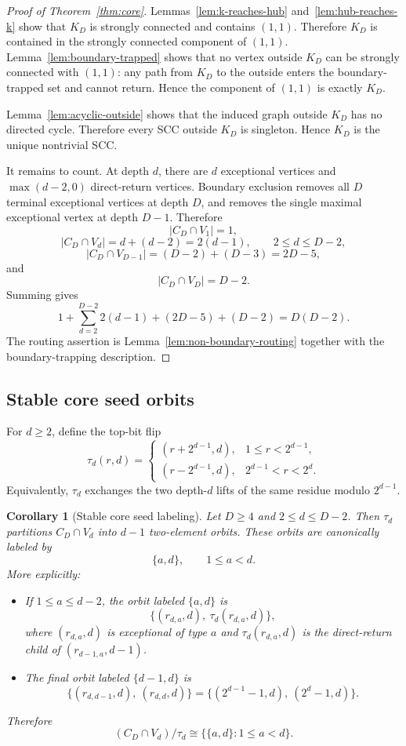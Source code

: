 \documentclass[11pt]{article}
\newtheorem{corollary}[theorem]{Corollary}
\theoremstyle{definition}
\theoremstyle{remark}
\begin{document}
\begin{proof}[Proof of Theorem~\ref{thm:core}]
Lemmas~\ref{lem:k-reaches-hub} and~\ref{lem:hub-reaches-k} show that $K_D$ is strongly connected and contains $(1,1)$.  Therefore $K_D$ is contained in the strongly connected component of $(1,1)$.  Lemma~\ref{lem:boundary-trapped} shows that no vertex outside $K_D$ can be strongly connected with $(1,1)$: any path from $K_D$ to the outside enters the boundary-trapped set and cannot return.  Hence the component of $(1,1)$ is exactly $K_D$.

Lemma~\ref{lem:acyclic-outside} shows that the induced graph outside $K_D$ has no directed cycle.  Therefore every SCC outside $K_D$ is singleton.  Hence $K_D$ is the unique nontrivial SCC.

It remains to count.  At depth $d$, there are $d$ exceptional vertices and $\max(d-2,0)$ direct-return vertices.  Boundary exclusion removes all $D$ terminal exceptional vertices at depth $D$, and removes the single maximal exceptional vertex at depth $D-1$.  Therefore
\[
|C_D\cap V_1|=1,
\]
\[
|C_D\cap V_d|=d+(d-2)=2(d-1),
\qquad 2\le d\le D-2,
\]
\[
|C_D\cap V_{D-1}|=(D-2)+(D-3)=2D-5,
\]
and
\[
|C_D\cap V_D|=D-2.
\]
Summing gives
\[
1+
\sum_{d=2}^{D-2}2(d-1)
+(2D-5)
+(D-2)
=D(D-2).
\]
The routing assertion is Lemma~\ref{lem:non-boundary-routing} together with the boundary-trapping description.
\end{proof}

\subsection{Stable core seed orbits}\label{subsec:core-seeds}

For $d\ge2$, define the top-bit flip
\[
\tau_d(r,d)=
\begin{cases}
(r+2^{d-1},d),&1\le r<2^{d-1},\\
(r-2^{d-1},d),&2^{d-1}<r<2^d.
\end{cases}
\]
Equivalently, $\tau_d$ exchanges the two depth-$d$ lifts of the same residue modulo $2^{d-1}$.

\begin{corollary}[Stable core seed labeling]\label{cor:core-seeds}
Let $D\ge4$ and $2\le d\le D-2$.  Then $\tau_d$ partitions $C_D\cap V_d$ into $d-1$ two-element orbits.  These orbits are canonically labeled by
\[
\{a,d\},
\qquad
1\le a<d.
\]
More explicitly:
\begin{itemize}
\item If $1\le a\le d-2$, the orbit labeled $\{a,d\}$ is
\[
\{(r_{d,a},d),\ \tau_d(r_{d,a},d)\},
\]
where $(r_{d,a},d)$ is exceptional of type $a$ and $\tau_d(r_{d,a},d)$ is the direct-return child of $(r_{d-1,a},d-1)$.
\item The final orbit labeled $\{d-1,d\}$ is
\[
\{(r_{d,d-1},d),\ (r_{d,d},d)\}
=
\{(2^{d-1}-1,d),\ (2^d-1,d)\}.
\]
\end{itemize}
Therefore
\[
(C_D\cap V_d)/\tau_d
\cong
\{\{a,d\}:1\le a<d\}.
\]
\end{corollary}
\end{document}
